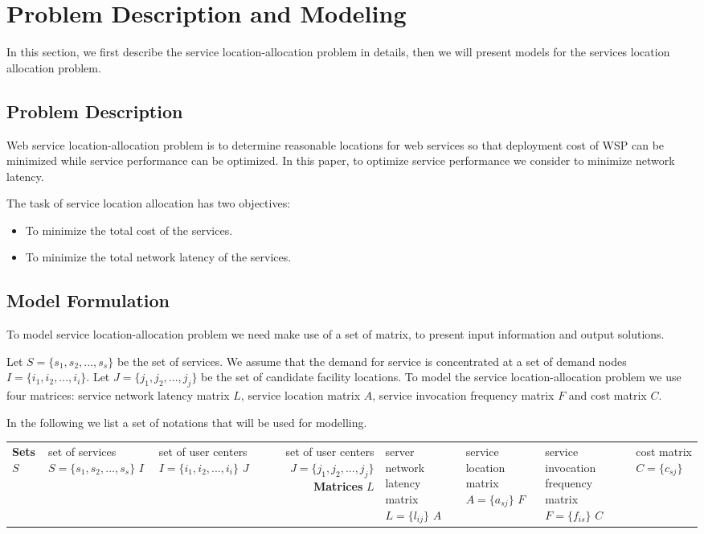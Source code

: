 \documentclass{llncs}
\begin{document}
\section{Problem Description and Modeling}
\label{sec:problem}
In this section, we first describe the service location-allocation problem in details, then we will present models for the services location allocation problem.

\subsection{Problem Description}
Web service location-allocation problem is to determine reasonable locations for web services so that deployment cost of WSP can be minimized while service performance can be optimized.
In this paper, to optimize service performance we consider to minimize network latency.

The task of service location allocation has two objectives:
\begin{itemize}
	\item To minimize the total cost of the services.
	\item To minimize the total network latency of the services.
\end{itemize}


\subsection{Model Formulation}
To model service location-allocation problem we need make use of a set of matrix, to present input information and output solutions. 

Let $S = \{ s_{1}, s_{2}, ..., s_{s}\}$ be the set of services. We assume that the demand for service is concentrated at a set of 
demand nodes $I = \{ i_{1}, i_{2}, ..., i_{i} \}$. Let $J = \{ j_{1}, j_{2}, ..., j_{j} \}$ be the set of candidate facility locations.
To model the service location-allocation problem we use four matrices: service network latency matrix $L$, service location
matrix $A$, service invocation frequency matrix $F$ and cost matrix $C$.

In the following we list a set of notations that will be used for modelling. 
\begin{center}
	\begin{tabular}{l*{2}{l}r}
		\hline
		\textbf{Sets} \cr
		$S$	& set of services $S = \{s_{1}, s_{2}, ..., s_{s}\}$ \cr
		$I$	& set of user centers $I = \{i_{1}, i_{2}, ..., i_{i}\}$ \cr
		$J$	& set of user centers $J = \{j_{1}, j_{2}, ..., j_{j}\}$ \cr
		\textbf{Matrices} \cr
		$L$ & server network latency matrix $L = \{l_{ij}\}$ \cr
		$A$ & service location matrix $A = \{a_{sj}\}$ \cr
		$F$ & service invocation frequency matrix $F = \{f_{is}\}$ \cr
		$C$ & cost matrix $C = \{c_{sj}\}$ \cr
		\hline
	\end{tabular}
\end{center}
\end{document}
